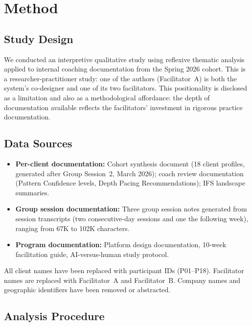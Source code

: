 \documentclass[sigchi,review,anonymous]{acmart}
\begin{document}
\section{Method}

\subsection{Study Design}

We conducted an interpretive qualitative study using reflexive thematic
analysis~\cite{braun2006} applied to internal coaching documentation from the Spring 2026
cohort. This is a researcher-practitioner study: one of the authors (Facilitator~A) is both
the system's co-designer and one of its two facilitators. This positionality is disclosed as
a limitation and also as a methodological affordance: the depth of documentation available
reflects the facilitators' investment in rigorous practice documentation.

\subsection{Data Sources}

\begin{itemize}[leftmargin=*]
  \item \textbf{Per-client documentation:} Cohort synthesis document (18 client profiles,
        generated after Group Session~2, March 2026); coach review documentation (Pattern
        Confidence levels, Depth Pacing Recommendations); IFS landscape summaries.
  \item \textbf{Group session documentation:} Three group session notes generated from
        session transcripts (two consecutive-day sessions and one the following week),
        ranging from 67K to 102K characters.
  \item \textbf{Program documentation:} Platform design documentation, 10-week facilitation
        guide, AI-versus-human study protocol.
\end{itemize}

All client names have been replaced with participant IDs (P01--P18). Facilitator names are
replaced with Facilitator~A and Facilitator~B. Company names and geographic identifiers have
been removed or abstracted.

\subsection{Analysis Procedure}
\end{document}
